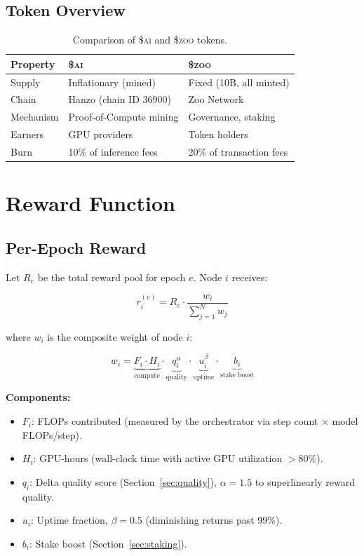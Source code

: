 \documentclass[11pt,letterpaper]{article}
\newcommand{\AI}{\$\textsc{ai}}
\newcommand{\ZOO}{\$\textsc{zoo}}
\begin{document}
\subsection{Token Overview}

\begin{table}[t]
\centering
\begin{tabular}{lll}
\toprule
\textbf{Property} & \textbf{\AI{}} & \textbf{\ZOO{}} \\
\midrule
Supply & Inflationary (mined) & Fixed (10B, all minted) \\
Chain & Hanzo (chain ID 36900) & Zoo Network \\
Mechanism & Proof-of-Compute mining & Governance, staking \\
Earners & GPU providers & Token holders \\
Burn & 10\% of inference fees & 20\% of transaction fees \\
\bottomrule
\end{tabular}
\caption{Comparison of \AI{} and \ZOO{} tokens.}
\label{tab:tokens}
\end{table}

\section{Reward Function}
\label{sec:rewards}

\subsection{Per-Epoch Reward}

Let $R_e$ be the total reward pool for epoch $e$.  Node $i$ receives:

\begin{equation}
    r_i^{(e)} = R_e \cdot \frac{w_i}{\sum_{j=1}^N w_j}
    \label{eq:reward}
\end{equation}

where $w_i$ is the composite weight of node $i$:

\begin{equation}
    w_i = \underbrace{F_i \cdot H_i}_{\text{compute}} \cdot \underbrace{q_i^{\alpha}}_{\text{quality}} \cdot \underbrace{u_i^{\beta}}_{\text{uptime}} \cdot \underbrace{b_i}_{\text{stake boost}}
    \label{eq:weight}
\end{equation}

\textbf{Components:}

\begin{itemize}
    \item $F_i$: FLOPs contributed (measured by the orchestrator via step count $\times$ model FLOPs/step).
    \item $H_i$: GPU-hours (wall-clock time with active GPU utilization $>$80\%).
    \item $q_i$: Delta quality score (Section~\ref{sec:quality}), $\alpha = 1.5$ to superlinearly reward quality.
    \item $u_i$: Uptime fraction, $\beta = 0.5$ (diminishing returns past 99\%).
    \item $b_i$: Stake boost (Section~\ref{sec:staking}).
\end{itemize}
\end{document}
